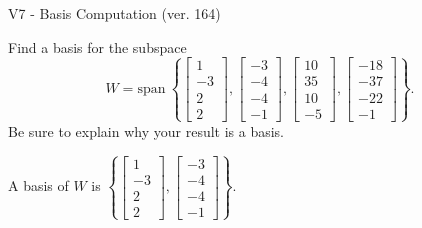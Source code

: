 \begin{exercise}
  \begin{exerciseTitle}V7 - Basis Computation (ver. 164)\end{exerciseTitle}
  \begin{exerciseStatement}
    Find a basis for the subspace 
\[W=\mathrm{span}\ \left\{\left[\begin{array}{r}
1 \\
-3 \\
2 \\
2
\end{array}\right] , \left[\begin{array}{r}
-3 \\
-4 \\
-4 \\
-1
\end{array}\right] , \left[\begin{array}{r}
10 \\
35 \\
10 \\
-5
\end{array}\right] , \left[\begin{array}{r}
-18 \\
-37 \\
-22 \\
-1
\end{array}\right]\right\}.\]
 Be sure to explain why your result is a basis.


  \end{exerciseStatement}
  \begin{exerciseAnswer}
   A basis of \(W\) is  \(\left\{\left[\begin{array}{r}
1 \\
-3 \\
2 \\
2
\end{array}\right] , \left[\begin{array}{r}
-3 \\
-4 \\
-4 \\
-1
\end{array}\right]\right\}\).
  


  \end{exerciseAnswer}
\end{exercise}